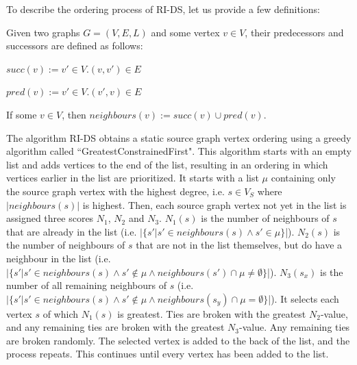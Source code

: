 To describe the ordering process of RI-DS, let us provide a few definitions:

\begin{defn}
Given two graphs $G=(V, E, L)$ and some vertex $v \in V$, their predecessors and successors are defined as follows:

$\mathit{succ}(v) := {v' \in V . (v, v') \in E}$

$\mathit{pred}(v) := {v' \in V . (v', v) \in E}$
 
\end{defn}

\begin{defn}
If some $v\in V$, then $\mathit{neighbours}(v):= \mathit{succ}(v) \cup \mathit{pred}(v)$.
\end{defn}



The algorithm RI-DS obtains a static source graph vertex ordering using a greedy algorithm called ``GreatestConstrainedFirst". This algorithm starts with an empty list and adds vertices to the end of the list, resulting in an ordering in which vertices earlier in the list are prioritized. It starts with a list $\mu$ containing only the source graph vertex with the highest degree, i.e. $s\in V_S$ where $|\mathit{neighbours}(s)|$ is highest. Then, each source graph vertex not yet in the list is assigned three scores $N_1$, $N_2$ and $N_3$. $N_1(s)$ is the number of neighbours of $s$ that are already in the list (i.e. $|\{s' | s' \in \mathit{neighbours}(s) \land s' \in \mu\}$|). $N_2(s)$ is the number of neighbours of $s$ that are not in the list themselves, but do have a neighbour in the list (i.e. $|\{s' | s' \in \mathit{neighbours}(s) \land s' \not \in \mu \land \mathit{neighbours}(s') \cap \mu \neq \emptyset\}$|). $N_3(s_x)$ is the number of all remaining neighbours of $s$ (i.e. $|\{s' | s' \in \mathit{neighbours}(s) \land s' \not \in \mu \land \mathit{neighbours}(s_y) \cap \mu = \emptyset\}$|). It selects each vertex $s$ of which $N_1(s)$ is greatest. Ties are broken with the greatest $N_2$-value, and any remaining ties are broken with the greatest $N_3$-value. Any remaining ties are broken randomly. The selected vertex is added to the back of the list, and the process repeats. This continues until every vertex has been added to the list.


